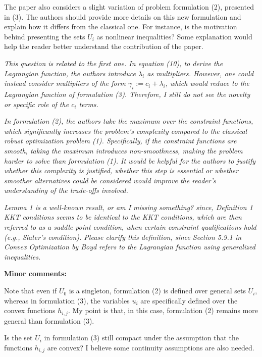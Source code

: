 \documentclass[journal,twoside,web]{ieeecolor}
\begin{document}
The paper also considers a slight variation of problem formulation (2), presented in (3). The authors should provide more details on this new formulation and explain how it differs from the classical one. For instance, is the motivation behind presenting the sets $U_i$ as nonlinear inequalities? Some explanation would help the reader better understand the contribution of the paper.

\textcolor{reviewerred}{\textit{This question is related to the first one. In equation (10), to derive the Lagrangian function, the authors introduce $\lambda_i$ as multipliers. However, one could instead consider multipliers of the form $\gamma_i := c_i + \lambda_i$, which would reduce to the Lagrangian function of formulation (3). Therefore, I still do not see the novelty or specific role of the $c_i$ terms.}}

\textcolor{reviewerred}{\textit{In formulation (2), the authors take the maximum over the constraint functions, which significantly increases the problem's complexity compared to the classical robust optimization problem (1). Specifically, if the constraint functions are smooth, taking the maximum introduces non-smoothness, making the problem harder to solve than formulation (1). It would be helpful for the authors to justify whether this complexity is justified, whether this step is essential or whether smoother alternatives could be considered would improve the reader's understanding of the trade-offs involved.}}

\textcolor{reviewerred}{\textit{Lemma 1 is a well-known result, or am I missing something? since, Definition 1 KKT conditions seems to be identical to the KKT conditions, which are then referred to as a saddle point condition, when certain constraint qualifications hold (e.g., Slater's condition). Please clarify this definition, since Section 5.9.1 in Convex Optimization by Boyd refers to the Lagrangian function using generalized inequalities.}}

\textbf{Minor comments:}

Note that even if $U_0$ is a singleton, formulation (2) is defined over general sets $U_i$, whereas in formulation (3), the variables $u_i$ are specifically defined over the convex functions $h_{i,j}$. My point is that, in this case, formulation (2) remains more general than formulation (3).

Is the set $U_i$ in formulation (3) still compact under the assumption that the functions $h_{i,j}$ are convex? I believe some continuity assumptions are also needed.
\end{document}
